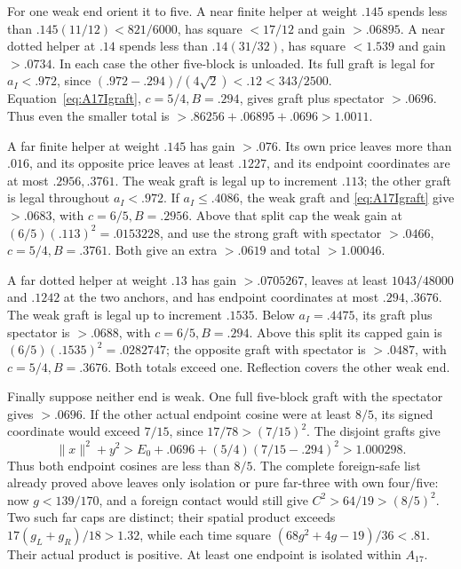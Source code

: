 \documentclass[11pt]{article}
\theoremstyle{definition}
\theoremstyle{remark}
\newcommand{\norm}[1]{\lVert #1\rVert}
\begin{document}
For one weak end orient it to five. A near finite helper at weight
\(.145\) spends less than \(.145(11/12)<821/6000\), has square
\(<17/12\) and gain \(>.06895\). A near dotted helper at
\(.14\) spends less than \(.14(31/32)\), has square \(<1.539\)
and gain \(>.0734\). In each case the other five-block is unloaded.
Its full graft is legal for \(a_I<.972\), since
\((.972-.294)/(4\sqrt2)<.12<343/2500\).
Equation~\eqref{eq:A17Igraft}, \(c=5/4,B=.294\), gives
graft plus spectator \(>.0696\). Thus even the smaller total
is \(>.86256+.06895+.0696>1.0011\).

A far finite helper at weight \(.145\) has gain \(>.076\).
Its own price leaves more than \(.016\), and its opposite price
leaves at least \(.1227\),
and its endpoint coordinates are at most \(.2956,.3761\).
The weak graft is legal up to increment \(.113\); the other
graft is legal throughout \(a_I<.972\). If \(a_I\le.4086\),
the weak graft and \eqref{eq:A17Igraft} give \(>.0683\),
with \(c=6/5,B=.2956\). Above that split cap the weak gain
at \((6/5)(.113)^2=.0153228\), and use the strong graft
with spectator \(>.0466\), \(c=5/4,B=.3761\).
Both give an extra \(>.0619\) and total \(>1.00046\).

A far dotted helper at weight \(.13\) has gain \(>.0705267\),
leaves at least \(1043/48000\) and \(.1242\) at the two anchors,
and has endpoint coordinates at most \(.294,.3676\).
The weak graft is legal up to increment \(.1535\).
Below \(a_I=.4475\), its graft plus spectator is \(>.0688\),
with \(c=6/5,B=.294\). Above this split its capped gain is
\((6/5)(.1535)^2=.0282747\); the opposite graft with spectator
is \(>.0487\), with \(c=5/4,B=.3676\).
Both totals exceed one. Reflection covers the other weak end.

Finally suppose neither end is weak. One full five-block graft with
the spectator gives \(>.0696\). If the other actual endpoint
cosine were at least \(8/5\), its signed coordinate would exceed
\(7/15\), since \(17/78>(7/15)^2\). The disjoint grafts give
\[
 \norm x^2+y^2>E_0+.0696+(5/4)(7/15-.294)^2>1.000298.
\]
Thus both endpoint cosines are less than \(8/5\). The complete
foreign-safe list already proved above leaves only isolation or pure
far-three with own four/five: now \(g<139/170\), and a foreign
contact would still give \(C^2>64/19>(8/5)^2\).
Two such far caps are distinct; their spatial product exceeds
\(17(g_L+g_R)/18>1.32\), while each time square
\((68g^2+4g-19)/36<.81\). Their actual product is positive.
At least one endpoint is isolated within \(A_{17}\).
\end{document}
